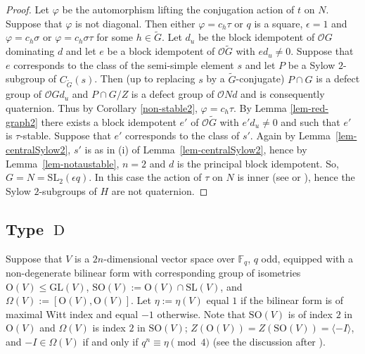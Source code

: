 \documentclass{amsart}
\theoremstyle{plain}\newtheorem{Theorem}{Theorem}[section]
\theoremstyle{plain}\newtheorem{Conjecture}[Theorem]{Conjecture}
\theoremstyle{plain}\newtheorem{Corollary}[Theorem]{Corollary}
\theoremstyle{plain}\newtheorem{Lemma}[Theorem]{Lemma}
\theoremstyle{plain}\newtheorem{Proposition}[Theorem]{Proposition}
\theoremstyle{definition}\newtheorem{Definition}[Theorem]{Definition}
\theoremstyle{definition}\newtheorem{Example}[Theorem]{Example}
\theoremstyle{definition}\newtheorem{Examples}[Theorem]{Examples}
\theoremstyle{definition}\newtheorem{Exercise}[Theorem]{Exercise}
\theoremstyle{definition}\newtheorem{Notation}[Theorem]{Notation}
\theoremstyle{definition}\newtheorem{Remark}[Theorem]{Remark}
\theoremstyle{definition}\newtheorem{Remarks}[Theorem]{Remarks}
\def\CO{{\mathcal{O}}}    \def\OPE{{\mathcal{O}(P\rtimes E)}}
\def\GL{\mathrm{GL}}
\def \O{\mathrm{O}}
\def\SL{\mathrm{SL}}
\def\SO{\mathrm{SO}}
\newcommand{\type}{\operatorname}
\newcommand{\wt}{\widetilde}
\numberwithin{equation}{section}
\begin{document}
\begin{proof}   
Let $\varphi $ be   the automorphism lifting the conjugation  action of $t$  on $ N$.  Suppose that $\varphi$ is not diagonal.  Then  either  $\varphi = c_h  \tau $   or  $q $ is a square, $\epsilon = 1 $   and $\varphi= c_h \sigma $  or $\varphi=  c_h \sigma \tau $ for some $ h \in \wt{G}$.  
Let $d_u$ be the  block idempotent of $\CO G$  dominating $d$  and let $e$  be a block  idempotent of $\CO \wt{G}$   with $ed_u \ne 0 $.    Suppose that   $e$  corresponds to the  class of the  semi-simple element $s$ and let  $P$ be a  Sylow  $2$-subgroup of  $C_{\wt{G}}(s) $.   Then (up to replacing $s$ by a $\wt{G}$-conjugate) $P \cap  G $ is a defect group of $\CO G d_u $ and $P \cap G/Z  $ is a defect group of  $\CO Nd $  and  is consequently quaternion.   Thus by  Corollary  \ref{non-stable2},   $\varphi = c_h  \tau $.  By 
 Lemma \ref{lem-red-graph2}  there exists  a block  idempotent   $e'$  of $\CO \wt{G}$   with $e'd_u \ne 0 $ and such that $e'$ is $\tau$-stable.    Suppose that $e'$ corresponds to the  class of $s'$. Again by  Lemma~\ref{lem-centralSylow2}, $s'$ is as in (i) of Lemma~\ref{lem-centralSylow2}, hence by Lemma~\ref{lem-notaustable},    $n=2 $ and $d$ is the principal block idempotent.  So,   $G= N  = \SL_2 (\epsilon q) $.   In this case the  action of $\tau $  on $N$   is  inner (see \cite[p.~68]{GLS3} or \cite[Prop.~24.23]{MT}),  hence the Sylow $2$-subgroups of $H$ are not quaternion.
\end{proof} 



\subsection{Type $\type{D}$} Suppose that $V$ is a  $2n$-dimensional vector space  over  ${\mathbb F}_q$, $q$ odd,  equipped with a non-degenerate bilinear form   with corresponding group of isometries $ \O(V) \leq \GL(V)$, $\SO(V):=\O(V) \cap \SL(V)$,  and  $\Omega (V):= [\O(V), \O(V)]$.    Let $\eta:= \eta(V)  $   equal $1$  if the bilinear form is of maximal Witt index and equal  $-1$   otherwise. Note that  $\SO(V)$ is of index $2$ in $\O(V)$ and  $\Omega (V) $ is index $2$ in $\SO(V)$;   
 $ Z(\O(V) )  =  Z(\SO(V))= \langle -I\rangle  $,  and   $-I  \in  \Omega(V) $ if and only if $q^n\equiv  \eta \pmod 4$ (see the discussion after \cite[Thm.~11.51]{Tay06}).
\end{document}

